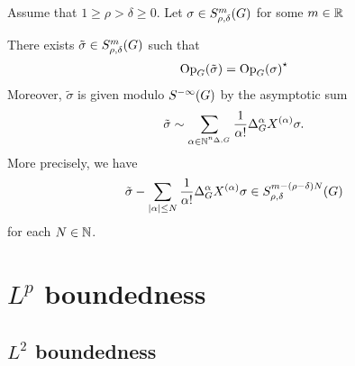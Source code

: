 \begin{theorem}
\label{theorem:adjunction_formula}
    Assume that $1 \geq \rho > \delta \geq 0$.
    Let
    $\sigma \in S^{m}_{\rho, \delta}(G)$ for some $m \in \mathbb{R}$

    There exists $\tilde \sigma \in S^{m}_{\rho, \delta}(G)$ such that
    \begin{align*}
        \mathrm{Op}_{G} (\tilde \sigma) = {\mathrm{Op}_{G}(\sigma)}^\star
    \end{align*}
    Moreover,
    $\tilde \sigma$ is given modulo ${S^{-\infty} (G)}$ by the asymptotic sum
    \begin{align*}
        \tilde \sigma \sim
        \sum_{\alpha \in \mathbb{N}^{n_{\Delta, G}}} \frac 1 {\alpha!} {\Delta_{G}^{\alpha}} X^{(\alpha)} \sigma.
    \end{align*}
    More precisely,
    we have
    \begin{align*}
        \tilde \sigma
        - \sum_{\left|{\alpha}\right| \leq N} \frac 1 {\alpha!} {\Delta_{G}^{\alpha}} X^{(\alpha)} \sigma \in S^{m - (\rho - \delta) N}_{\rho, \delta}(G)
    \end{align*}
    for each $N \in \mathbb{N}$.
\end{theorem}

\section{\texorpdfstring{$L^p$}{Lp} boundedness}

\subsection{\texorpdfstring{$L^2$}{L2} boundedness}

